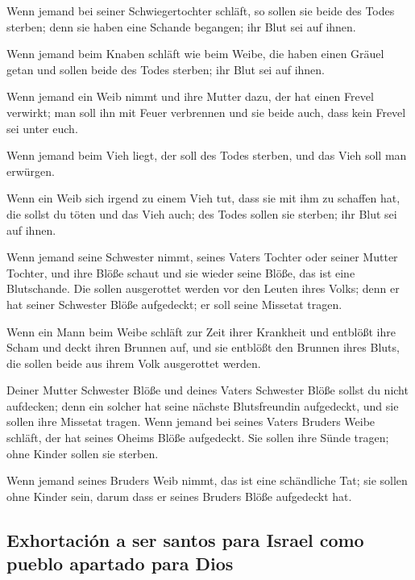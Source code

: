  Wenn jemand bei seiner Schwiegertochter schläft, so
sollen sie beide des Todes sterben; denn sie haben eine Schande
begangen; ihr Blut sei auf ihnen.

 Wenn jemand beim Knaben schläft wie beim Weibe, die
haben einen Gräuel getan und sollen beide des Todes sterben; ihr Blut
sei auf ihnen.

 Wenn jemand ein Weib nimmt und ihre Mutter dazu, der hat
einen Frevel verwirkt; man soll ihn mit Feuer verbrennen und sie beide
auch, dass kein Frevel sei unter euch.

 Wenn jemand beim Vieh liegt, der soll des Todes sterben,
und das Vieh soll man erwürgen.

 Wenn ein Weib sich irgend zu einem Vieh tut, dass sie
mit ihm zu schaffen hat, die sollst du töten und das Vieh auch; des
Todes sollen sie sterben; ihr Blut sei auf ihnen.

 Wenn jemand seine Schwester nimmt, seines Vaters Tochter
oder seiner Mutter Tochter, und ihre Blöße schaut und sie wieder seine
Blöße, das ist eine Blutschande. Die sollen ausgerottet werden vor den
Leuten ihres Volks; denn er hat seiner Schwester Blöße aufgedeckt; er
soll seine Missetat tragen.

 Wenn ein Mann beim Weibe schläft zur Zeit ihrer
Krankheit und entblößt ihre Scham und deckt ihren Brunnen auf, und sie
entblößt den Brunnen ihres Bluts, die sollen beide aus ihrem Volk
ausgerottet werden.

 Deiner Mutter Schwester Blöße und deines Vaters
Schwester Blöße sollst du nicht aufdecken; denn ein solcher hat seine
nächste Blutsfreundin aufgedeckt, und sie sollen ihre Missetat tragen.
 Wenn jemand bei seines Vaters Bruders Weibe schläft, der
hat seines Oheims Blöße aufgedeckt. Sie sollen ihre Sünde tragen; ohne
Kinder sollen sie sterben.

 Wenn jemand seines Bruders Weib nimmt, das ist eine
schändliche Tat; sie sollen ohne Kinder sein, darum dass er seines
Bruders Blöße aufgedeckt hat.

\hypertarget{exhortaciuxf3n-a-ser-santos-para-israel-como-pueblo-apartado-para-dios}{%
\subsection{Exhortación a ser santos para Israel como pueblo apartado
para
Dios}\label{exhortaciuxf3n-a-ser-santos-para-israel-como-pueblo-apartado-para-dios}}


